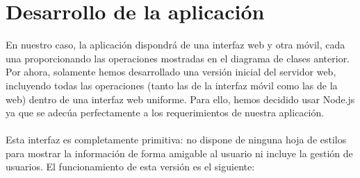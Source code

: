 \documentclass{article}
\begin{document}
\section{Desarrollo de la aplicación}
En nuestro caso, la aplicación dispondrá de una interfaz web y otra móvil, cada una proporcionando las operaciones mostradas en el diagrama de clases anterior. \\
Por ahora, solamente hemos desarrollado una versión inicial del servidor web, incluyendo todas las operaciones (tanto las de la interfaz móvil como las de la web) dentro de una interfaz web uniforme. Para ello, hemos decidido usar Node.js ya que se adecúa perfectamente a los requerimientos de nuestra aplicación. \\ ~ \\
Esta interfaz es completamente primitiva: no dispone de ninguna hoja de estilos para mostrar la información de forma amigable al usuario ni incluye la gestión de usuarios. El funcionamiento de esta versión es el siguiente:
\end{document}

